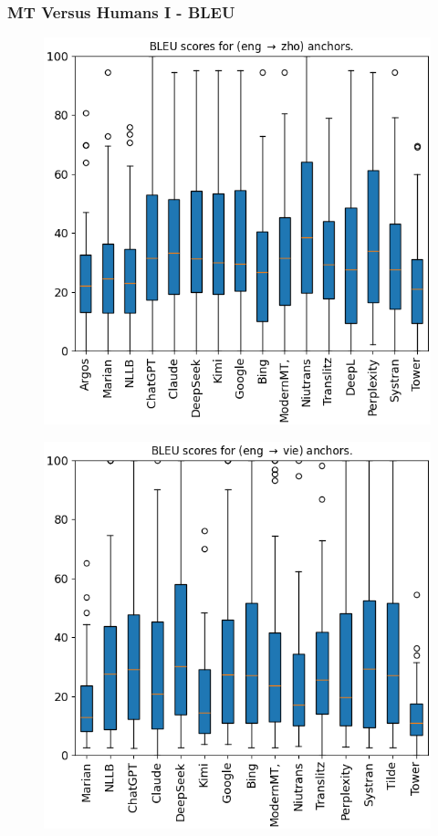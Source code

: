 \documentclass[aspectratio=169]{beamer}
\begin{document}
\begin{frame}[fragile]
	\frametitle{MT Versus Humans I - BLEU}
    \begin{minipage}{.33\textwidth}
    \begin{figure}
        \centering
        \includegraphics[width=1.0\textwidth]{images/eval-01-Chinese-Anchors-bleu.png} 
    \end{figure}
    \end{minipage}%
    \begin{minipage}{.33\textwidth}
    \begin{figure}
        \centering
        \includegraphics[width=1.0\textwidth]{images/eval-01-Vietnamese-Anchors-bleu.png} 

\end{figure}
\end{minipage}
\end{frame}
\end{document}
